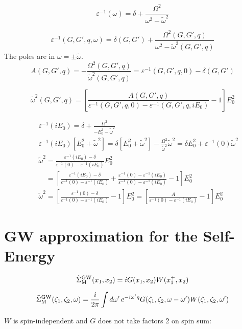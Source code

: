 \documentclass[fleqn]{article}
\begin{document}
\[
  \varepsilon^{-1}(\omega) =
  \delta + \frac{\Omega^2}{\omega^2 - \tilde{\omega}^2}
\]

\[
  \varepsilon^{-1}(G,G',q,\omega) =
  \delta(G,G') + \frac{\Omega^2(G,G',q)}{\omega^2 - \tilde{\omega}^2(G,G',q)}
\]
The poles are in $\omega = \pm \tilde{\omega}$.
\[
  A(G,G',q) = - \frac{\Omega^2(G,G',q)}{\tilde{\omega}^2(G,G',q)} =
  \varepsilon^{-1}(G,G',q,0) - \delta(G,G')
\]

\[
  \tilde{\omega}^2(G,G',q) =
  \left[ \frac{A(G,G',q)}{\varepsilon^{-1}(G,G',q,0) - \varepsilon^{-1}(G,G',q,iE_0)} - 1 \right] E_0^2
\]

\begin{eqnarray*}
  &&
  \varepsilon^{-1}(iE_0) = \delta + \frac{\Omega^2}{-E_0^2 - \tilde{\omega}^2}
  \\ &&
 \varepsilon^{-1}(iE_0) [E_0^2 + \tilde{\omega}^2] =
  \delta [E_0^2 + \tilde{\omega}^2] - \frac{\Omega^2}{\tilde{\omega}^2} \tilde{\omega}^2 =
  \delta E_0^2 + \varepsilon^{-1}(0) \tilde{\omega}^2
  \\ &&
  \tilde{\omega}^2 =
  \frac{\varepsilon^{-1}(iE_0) - \delta}{\varepsilon^{-1}(0) - \varepsilon^{-1}(iE_0)} E_0^2
  \\ && \phantom{\tilde{\omega}^2} =
  \left[ \frac{\varepsilon^{-1}(iE_0) - \delta}{\varepsilon^{-1}(0) - \varepsilon^{-1}(iE_0)} +
  \frac{\varepsilon^{-1}(0) - \varepsilon^{-1}(iE_0)}{\varepsilon^{-1}(0) - \varepsilon^{-1}(iE_0)}
  -1 \right] E_0^2
  \\ &&
  \tilde{\omega}^2 =
  \left[ \frac{\varepsilon^{-1}(0) - \delta}{\varepsilon^{-1}(0) - \varepsilon^{-1}(iE_0)} - 1 \right] E_0^2
  = \left[ \frac{A}{\varepsilon^{-1}(0) - \varepsilon^{-1}(iE_0)} - 1 \right] E_0^2
\end{eqnarray*}

\newpage

\section{GW approximation for the Self-Energy}

\[
  \tilde{\Sigma}^{\rm GW}_{\rm M}(x_1,x_2) = i G(x_1,x_2) W(x_1^+,x_2)
\]

\[
  \tilde{\Sigma}^{\rm GW}_{\rm M}(\zeta_1,\zeta_2,\omega) =
  \frac{i}{2 \pi} \int d\omega' \, e^{-i \omega' \eta}
  G(\zeta_1,\zeta_2,\omega-\omega')
  W(\zeta_1,\zeta_2,\omega')
\]

$W$ is spin-independent and $G$ does not take factors 2 on spin sum:
\end{document}
